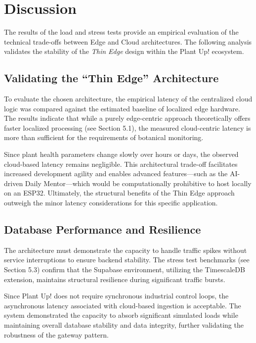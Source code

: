\section{Discussion}

The results of the load and stress tests provide an empirical evaluation of the technical trade-offs between Edge and Cloud architectures. The following analysis validates the stability of the \textit{Thin Edge} design within the Plant Up! ecosystem.

\subsection{Validating the ``Thin Edge'' Architecture}

To evaluate the chosen architecture, the empirical latency of the centralized cloud logic was compared against the estimated baseline of localized edge hardware. The results indicate that while a purely edge-centric approach theoretically offers faster localized processing (see Section 5.1), the measured cloud-centric latency is more than sufficient for the requirements of botanical monitoring.

Since plant health parameters change slowly over hours or days, the observed cloud-based latency remains negligible. This architectural trade-off facilitates increased development agility and enables advanced features—such as the AI-driven Daily Mentor—which would be computationally prohibitive to host locally on an ESP32. Ultimately, the structural benefits of the Thin Edge approach outweigh the minor latency considerations for this specific application.

\subsection{Database Performance and Resilience}

The architecture must demonstrate the capacity to handle traffic spikes without service interruptions to ensure backend stability. The stress test benchmarks (see Section 5.3) confirm that the Supabase environment, utilizing the TimescaleDB extension, maintains structural resilience during significant traffic bursts. 

Since Plant Up! does not require synchronous industrial control loops, the asynchronous latency associated with cloud-based ingestion is acceptable. The system demonstrated the capacity to absorb significant simulated loads while maintaining overall database stability and data integrity, further validating the robustness of the gateway pattern.

